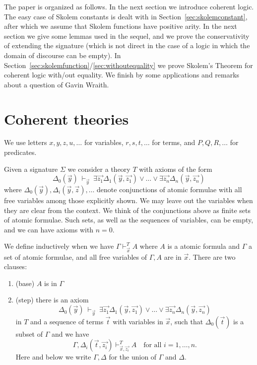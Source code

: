 \documentclass[10pt,a4paper]{article}
\begin{document}
The paper is organized as follows. In the next section we introduce coherent logic.
The easy case of Skolem constants is dealt with in Section~\ref{sec:skolemconstant},
after which we assume that Skolem functions have positive arity. In the next
section we give some lemmas used in the sequel, and we prove the
conservativity of extending the signature (which is not direct in the case
of a logic in which the domain of discourse can be empty). 
In Section~\ref{sec:skolemfunction}/\ref{sec:withoutequality} 
we prove Skolem's Theorem for coherent logic with/out equality.
We finish by some applications and remarks about a question of Gavin Wraith. 

\section{Coherent theories}\label{coherent}
 
We use letters $x,y,z,u,\dots$ for variables,
$r,s,t,\dots$ for terms, and $P,Q,R,\ldots$ for predicates.

\medskip

Given a signature $\Sigma$ we consider a theory $T$ with axioms of the form
$$
\Delta_0(\vec{y})~\vdash_{\vec{y}}~
\exists \vec{z_1}\Delta_1(\vec{y},\vec{z_1})\vee\dots\vee\exists \vec{z_n}\Delta_n(\vec{y},\vec{z_n})
$$
where $\Delta_0(\vec{y}),\Delta_i(\vec{y},\vec{z}), \dots$
denote conjunctions of atomic formulae
with all free variables among those explicitly shown. We may leave out the variables
when they are clear from the context.
We think of the conjunctions above as finite sets of atomic formulae.
Such sets, as well as the sequences of variables, can be empty, 
and we can have axioms with $n=0$. 

We define inductively when we have $\Gamma\vdash_{\vec{x}}^T A$ 
where $A$ is a atomic formula and $\Gamma$ a set of atomic formulae,
and all free variables of $\Gamma,A$ are in $\vec{x}$. There are two clauses:

\begin{enumerate}
\item (base) $A$ is in $\Gamma$ 

\item (step) there is an axiom 
$$
\Delta_0(\vec{y})~\vdash_{\vec{y}}~
\exists \vec{z_1}\Delta_1(\vec{y},\vec{z_1})\vee\dots\vee\exists \vec{z_n}\Delta_n(\vec{y},\vec{z_n})
$$
in $T$ and a sequence of terms $\vec{t}$ with variables in $\vec{x}$,
such that $\Delta_0(\vec{t})$ is a subset of $\Gamma$ and
we have 
$$
\Gamma,\Delta_i(\vec{t},\vec{z_i})\vdash^T_{\vec{x},\vec{z_i}} A
\quad \text{for all $i = 1,\dots,n$.}
$$
Here and below we write $\Gamma,\Delta$ for the union of $\Gamma$ and $\Delta$.
\end{enumerate}
\end{document}
